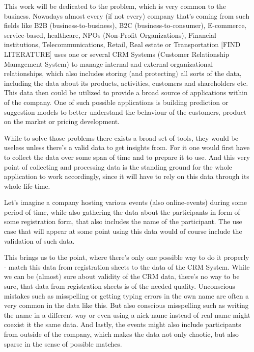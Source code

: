 \documentclass[
	ngerman,
	ruledheaders=section,%
	class=report,%
	thesis={type=bachelor},%
	accentcolor=9c,%
	custommargins=true,%
	marginpar=false,%
	parskip=half-,%
	fontsize=11pt,%
	logofile=tud_logo.png, %
]{tudapub}
\begin{document}
This work will be dedicated to the problem, which is very common to the business. Nowadays almost every (if not every) company  that's coming from such fields like B2B (business-to-business), B2C (business-to-consumer), E-commerce, service-based, healthcare, NPOs (Non-Profit Organizations), Financial institutions, Telecommunications, Retail, Real estate or Transportation [FIND LITERATURE] uses one or several CRM Systems (Customer Relationship Management System) to manage internal and external organizational relationships, which also includes storing (and protecting) all sorts of the data, including the data about its products, activities, customers and shareholders etc. This data then could be utilized to provide a broad source of applications within of the company. One of such possible applications is building prediction or suggestion models to better understand the behaviour of the customers, product on the market or pricing development. 

While to solve those problems there exists a broad set of tools, they would be useless unless there's a valid data to get insights from. For it one would first have to collect the data over some span of time and to prepare it to use. And this very point of collecting and processing data is the standing ground for the whole application to work accordingly, since it will have to rely on this data through its whole life-time.

Let's imagine a company hosting various events (also online-events) during some period of time, while also gathering the data about the participants in form of some registration form, that also includes the name of the participant. The use case that will appear at some point using this data would of course include the validation of such data.

This brings us to the point, where there's only one possible way to do it properly - match this data from registration sheets to the data of the CRM System. While we can be (almost) sure about validity of the CRM data, there's no way to be sure, that data from registration sheets is of the needed quality. Unconscious mistakes such as misspelling or getting typing errors in the own name are often a very common in the data like this. But also conscious misspelling such as writing the name in a different way or even using a nick-name instead of real name might coexist it the same data. And lastly, the events might also include participants from outside of the company, which makes the data not only chaotic, but also sparse in the sense of possible matches.
\end{document}
